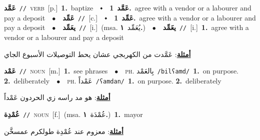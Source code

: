 \documentclass[10pt,a4paper,twoside]{article} %
\begin{document}
\begin{multicols}{2}
{\setlength\topsep{0pt}\textbf{\foreignlanguage{arabic}{عَمَّد}}\ {\color{gray}\texttt{//}\color{black}}\ \textsc{verb}\ [p.]\ \textbf{1.}~baptize\ \ $\smblkdiamond$\ \ \setlength\topsep{0pt}\textbf{\foreignlanguage{arabic}{عَمَّد}}\ \textbf{1.}~agree with a vendor or a labourer and pay a deposit\ \ $\bullet$\ \ \setlength\topsep{0pt}\textbf{\foreignlanguage{arabic}{عَمِّد}}\ {\color{gray}\texttt{//}\color{black}}\ [c.]\ \ $\smblkdiamond$\ \ \setlength\topsep{0pt}\textbf{\foreignlanguage{arabic}{عَمِّد}}\ \textbf{1.}~agree with a vendor or a labourer and pay a deposit\ \ $\bullet$\ \ \setlength\topsep{0pt}\textbf{\foreignlanguage{arabic}{يعَمِّد}}\ {\color{gray}\texttt{//}\color{black}}\ [i.]\ \color{gray}(msa. \foreignlanguage{arabic}{يُعَمِّد}~\foreignlanguage{arabic}{\textbf{١.}})\color{black}\ \ $\bullet$\ \ \setlength\topsep{0pt}\textbf{\foreignlanguage{arabic}{يعََمِّد}}\ {\color{gray}\texttt{//}\color{black}}\ [i.]\ \textbf{1.}~agree with a vendor or a labourer and pay a deposit\  \begin{flushright}\color{gray}\foreignlanguage{arabic}{\textbf{\underline{\foreignlanguage{arabic}{أمثلة}}}: عَمَّدت من الكهربجي عشان يحط التوصيلات الأسبوع الجاي}\end{flushright}\color{black}} \vspace{2mm}

{\setlength\topsep{0pt}\textbf{\foreignlanguage{arabic}{عَمْد}}\ {\color{gray}\texttt{//}\color{black}}\ \textsc{noun}\ [m.]\ \textbf{1.}~see phrases\ \ $\bullet$\ \ \textsc{ph.} \color{gray} \foreignlanguage{arabic}{بِالعَمْد}\color{black}\ {\color{gray}\texttt{/{\sffamily bilʕamd}/}\color{black}}\ \textbf{1.}~on purpose.  \textbf{2.}~deliberately\ \ $\bullet$\ \ \textsc{ph.} \color{gray} \foreignlanguage{arabic}{عَمْداً}\color{black}\ {\color{gray}\texttt{/{\sffamily ʕamdan}/}\color{black}}\ \textbf{1.}~on purpose.  \textbf{2.}~deliberately\  \begin{flushright}\color{gray}\foreignlanguage{arabic}{\textbf{\underline{\foreignlanguage{arabic}{أمثلة}}}: هو مد راسه زي الحردون عَمْداً}\end{flushright}\color{black}} \vspace{2mm}

{\setlength\topsep{0pt}\textbf{\foreignlanguage{arabic}{عُمْدِة}}\ {\color{gray}\texttt{//}\color{black}}\ \textsc{noun}\ [f.]\ \color{gray}(msa. \foreignlanguage{arabic}{عُمْدَة}~\foreignlanguage{arabic}{\textbf{١.}})\color{black}\ \textbf{1.}~mayor\  \begin{flushright}\color{gray}\foreignlanguage{arabic}{\textbf{\underline{\foreignlanguage{arabic}{أمثلة}}}: معزوم عند عُمْدِة طولكرم عمسخَّن}\end{flushright}\color{black}} \vspace{2mm}


\end{multicols}
\end{document}
